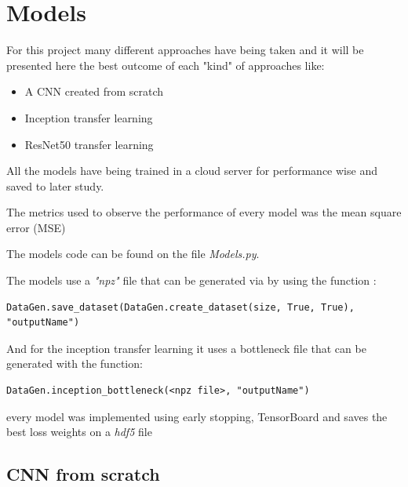 \documentclass[11pt]{article}
\begin{document}
\section{Models}
\label{sec:org7dbc137}

For this project many different approaches have being taken and it will be
presented here the best outcome of each "kind" of approaches like:

\begin{itemize}
\item A CNN created from scratch
\item Inception transfer learning
\item ResNet50 transfer learning
\end{itemize}

All the models have being trained in a cloud server for performance wise and
saved to later study.

The metrics used to observe the performance of every model was the mean square
error (MSE)

The models code can be found on the file \emph{Models.py}.

The models use a \emph{"npz"} file that can be generated via by using the function :
\begin{verbatim}
DataGen.save_dataset(DataGen.create_dataset(size, True, True), "outputName")
\end{verbatim}

And for the inception transfer learning it uses a bottleneck file that can be
generated with the function:

\begin{verbatim}
DataGen.inception_bottleneck(<npz file>, "outputName")
\end{verbatim}

every model was implemented using early stopping, TensorBoard and saves the
best loss weights on a \emph{hdf5} file   


\pagebreak

\subsection{CNN from scratch}
\label{sec:org73c2e53}
\end{document}
